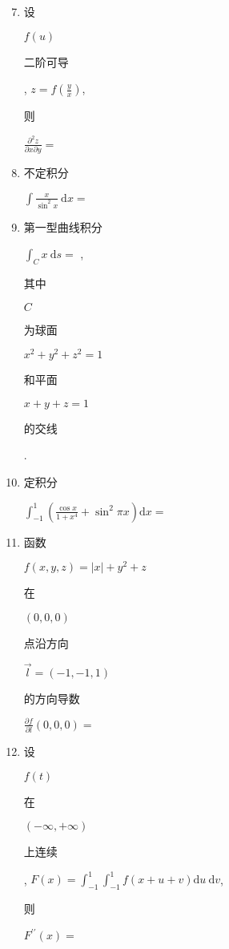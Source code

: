 \documentclass[10pt]{article}
\begin{document}
\begin{enumerate}
  \setcounter{enumi}{6}
  \item \begin{CJK}{UTF8}{mj}设\end{CJK} $f(u)$ \begin{CJK}{UTF8}{mj}二阶可导\end{CJK}, $z=f\left(\frac{y}{x}\right)$, \begin{CJK}{UTF8}{mj}则\end{CJK} $\frac{\partial^{2} z}{\partial x \partial y}=$

  \item \begin{CJK}{UTF8}{mj}不定积分\end{CJK} $\int \frac{x}{\sin ^{2} x} \mathrm{~d} x=$

  \item \begin{CJK}{UTF8}{mj}第一型曲线积分\end{CJK} $\int_{C} x \mathrm{~d} s=$ , \begin{CJK}{UTF8}{mj}其中\end{CJK} $C$ \begin{CJK}{UTF8}{mj}为球面\end{CJK} $x^{2}+y^{2}+z^{2}=1$ \begin{CJK}{UTF8}{mj}和平面\end{CJK} $x+y+z=1$ \begin{CJK}{UTF8}{mj}的交线\end{CJK}.

  \item \begin{CJK}{UTF8}{mj}定积分\end{CJK} $\int_{-1}^{1}\left(\frac{\cos x}{1+x^{4}}+\sin ^{2} \pi x\right) \mathrm{d} x=$

  \item \begin{CJK}{UTF8}{mj}函数\end{CJK} $f(x, y, z)=|x|+y^{2}+z$ \begin{CJK}{UTF8}{mj}在\end{CJK} $(0,0,0)$ \begin{CJK}{UTF8}{mj}点沿方向\end{CJK} $\vec{l}=(-1,-1,1)$ \begin{CJK}{UTF8}{mj}的方向导数\end{CJK} $\frac{\partial f}{\partial l}(0,0,0)=$

  \item \begin{CJK}{UTF8}{mj}设\end{CJK} $f(t)$ \begin{CJK}{UTF8}{mj}在\end{CJK} $(-\infty,+\infty)$ \begin{CJK}{UTF8}{mj}上连续\end{CJK}, $F(x)=\int_{-1}^{1} \int_{-1}^{1} f(x+u+v) \mathrm{d} u \mathrm{~d} v$, \begin{CJK}{UTF8}{mj}则\end{CJK} $F^{\prime \prime}(x)=$


\end{enumerate}
\end{document}
